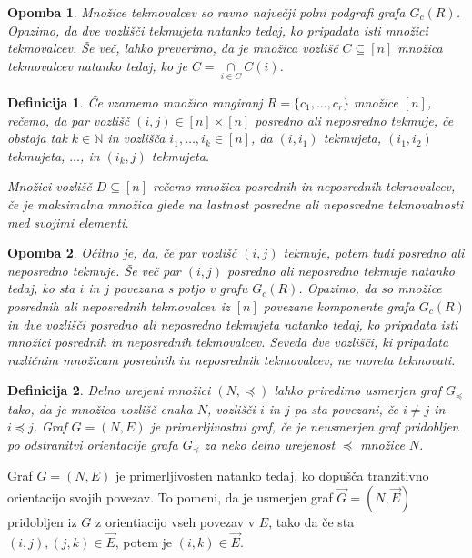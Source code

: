 \documentclass[a4paper, 12pt]{book}
\newtheorem{definicija}{Definicija}[chapter]
\newtheorem{opomba}{Opomba}[chapter]
\begin{document}
\begin{opomba}
    Množice tekmovalcev so ravno največji polni podgrafi grafa $G_c(R)$. Opazimo, da dve vozlišči tekmujeta natanko tedaj, ko pripadata isti množici tekmovalcev. Še več, lahko preverimo, da je množica vozlišč $C \subseteq [n]$ množica tekmovalcev natanko tedaj, ko je $C = \underset{i \in C}{\cap}C(i)$.
\end{opomba}

\begin{definicija}
    Če vzamemo množico rangiranj $R = \{ c_1, \dots, c_r\}$ množice $[n]$, rečemo, da par vozlišč $(i, j) \in [n] \times [n]$ posredno ali neposredno tekmuje, če obstaja tak $k \in \mathbb{N}$ in vozlišča $i_1, \dots, i_k \in [n]$, da $(i, i_1)$ tekmujeta, $(i_1, i_2)$ tekmujeta, $\dots$, in $(i_k, j)$ tekmujeta.

    Množici vozlišč $D \subseteq [n]$ rečemo množica posrednih in neposrednih tekmovalcev, če je maksimalna množica glede na lastnost posredne ali neposredne tekmovalnosti med svojimi elementi.
\end{definicija}

\begin{opomba}
    Očitno je, da, če par vozlišč $(i, j)$ tekmuje, potem tudi posredno ali neposredno tekmuje. Še več par $(i, j)$ posredno ali neposredno tekmuje natanko tedaj, ko sta $i$ in $j$ povezana s potjo v grafu $G_c(R)$. Opazimo, da so množice posrednih ali neposrednih tekmovalcev iz $[n]$ povezane komponente grafa $G_c(R)$ in dve vozlišči posredno ali neposredno tekmujeta natanko tedaj, ko pripadata isti množici posrednih in neposrednih tekmovalcev. Seveda dve vozlišči, ki pripadata različnim množicam posrednih in neposrednih tekmovalcev, ne moreta tekmovati.
\end{opomba}

\begin{definicija}
    Delno urejeni množici $(N, \preceq)$ lahko priredimo usmerjen graf $G_{\preceq}$ tako, da je množica vozlišč enaka $N$, vozlišči $i$ in $j$ pa sta povezani, če $i \neq j$ in $i \preceq j$.
    Graf $G = (N, E)$ je primerljivostni graf, če je neusmerjen graf pridobljen po odstranitvi orientacije grafa $G_{\preceq}$ za neko delno urejenost $\preceq$  množice $N$.
\end{definicija}
Graf $G = (N, E)$ je primerljivosten natanko tedaj, ko dopušča tranzitivno orientacijo svojih povezav. To pomeni, da je usmerjen graf $\overset{\rightarrow}{G} = (N, \overset{\rightarrow}{E})$ pridobljen iz $G$ z orientiacijo vseh povezav v $E$, tako da če sta $(i, j), (j, k) \in \overset{\rightarrow}{E}$, potem je $(i, k) \in \overset{\rightarrow}{E}$.
\end{document}
